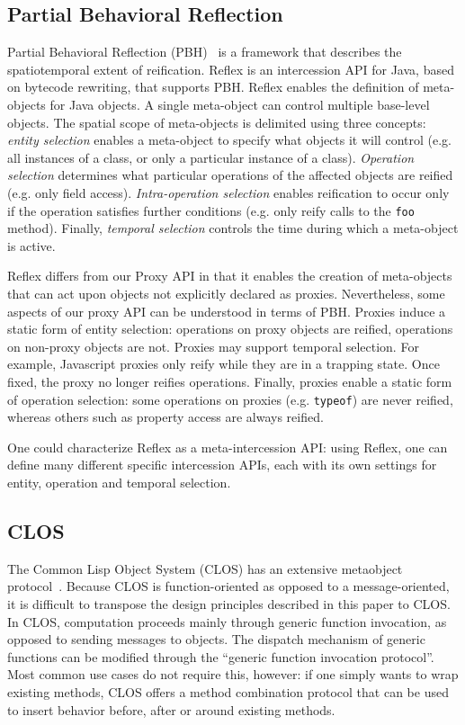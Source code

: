 \documentclass{sig-alternate}
\begin{document}
\subsection{Partial Behavioral Reflection}

Partial Behavioral Reflection (PBH)~\cite{tanter03pbh} is a framework that describes the spatiotemporal extent of reification. Reflex is an intercession API for Java, based on bytecode rewriting, that supports PBH. Reflex enables the definition of meta-objects for Java objects. A single meta-object can control multiple base-level objects. The spatial scope of meta-objects is delimited using three concepts: \emph{entity selection} enables a meta-object to specify what objects it will control (e.g. all instances of a class, or only a particular instance of a class). \emph{Operation selection} determines what particular operations of the affected objects are reified (e.g. only field access). \emph{Intra-operation selection} enables reification to occur only if the operation satisfies further conditions (e.g. only reify calls to the \texttt{foo} method). Finally, \emph{temporal selection} controls the time during which a meta-object is active.

Reflex differs from our Proxy API in that it enables the creation of meta-objects that can act upon objects not explicitly declared as proxies. Nevertheless, some aspects of our proxy API can be understood in terms of PBH. Proxies induce a static form of entity selection: operations on proxy objects are reified, operations on non-proxy objects are not. Proxies may support temporal selection. For example, Javascript proxies only reify while they are in a trapping state. Once fixed, the proxy no longer reifies operations. Finally, proxies enable a static form of operation selection: some operations on proxies (e.g. \texttt{typeof}) are never reified, whereas others such as property access are always reified.

One could characterize Reflex as a meta-intercession API: using Reflex, one can define many different specific intercession APIs, each with its own settings for entity, operation and temporal selection.

\subsection{CLOS}
\label{sub:clos}

The Common Lisp Object System (CLOS) has an extensive metaobject protocol~\cite{kiczales91art}. Because CLOS is function-oriented as opposed to a message-oriented, it is difficult to transpose the design principles described in this paper to CLOS. In CLOS, computation proceeds mainly through generic function invocation, as opposed to sending messages to objects. The dispatch mechanism of generic functions can be modified through the ``generic function invocation protocol''. Most common use cases do not require this, however: if one simply wants to wrap existing methods, CLOS offers a method combination protocol that can be used to insert behavior before, after or around existing methods.
\end{document}
